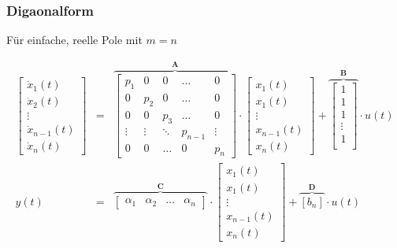 \begin{multicols}{2}
\subsubsection{Digaonalform}
  Für einfache, reelle Pole mit $m=n$ \\
  \scriptsize
    
    \begin{eqnarray*}
      \begin{bmatrix}
        \dot{x}_1(t) \\
        \dot{x}_2(t) \\
        \vdots \\
        \dot{x}_{n-1}(t) \\
        \dot{x}_n(t)
      \end{bmatrix} &=& \overbrace{ \begin{bmatrix}
        p_1 & 0 & 0 & \ldots & 0 \\
        0 & p_2 & 0 & \ldots & 0 \\
        0 & 0 & p_3 & \ldots & 0 \\
        \vdots & \vdots & \ddots & p_{n-1} & \vdots \\
        0 & 0 & \ldots & 0 & p_n
      \end{bmatrix}}^{\mathbf A} \cdot \begin{bmatrix}
        x_1(t) \\
        x_1(t) \\
        \vdots \\
        x_{n-1}(t) \\
        x_n(t)
      \end{bmatrix} + \overbrace{\begin{bmatrix}
        1 \\
        1 \\
        1 \\
        \vdots \\
        1 \\
      \end{bmatrix}}^{\mathbf{B}} \cdot u(t) \\
      y(t) &=& \overbrace{\begin{bmatrix}
        \alpha_1 & \alpha_2 & \ldots & \alpha_n
      \end{bmatrix}}^{\mathbf{C}} \cdot \begin{bmatrix}
        x_1(t) \\
        x_1(t) \\
        \vdots \\
        x_{n-1}(t) \\
        x_n(t)
      \end{bmatrix} + \overbrace{[b_n]}^{\mathbf{D}} \cdot u(t)
    \end{eqnarray*}
  \normalsize


\end{multicols}
